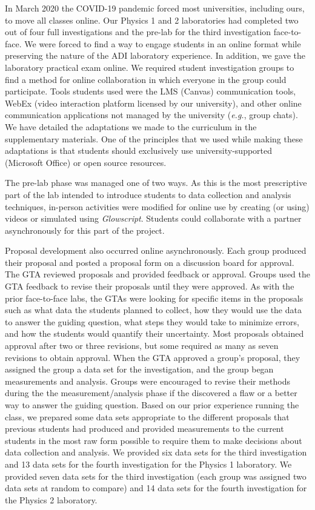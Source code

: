 \documentclass[aip, numerical, preprint]{revtex4-2}
\begin{document}
In March 2020 the COVID-19 pandemic forced most universities, including ours, to move all
classes online. Our Physics 1 and 2 laboratories had completed two out of
four full investigations and the pre-lab for the third investigation face-to-face. We were
forced to find a way to engage students in an online format while preserving the nature of the
ADI laboratory experience. In addition, we gave the laboratory practical exam online. We
required student investigation groups to find a method for online collaboration in which
everyone in the group could participate. Tools students used were the LMS (Canvas)
communication tools, WebEx (video interaction platform licensed by our university),
and other online communication applications not managed by the university (\emph{e.g.}, group
chats). We have detailed the adaptations we made to the curriculum in the supplementary
materials.  One of the principles that we used while making these adaptations is that students
should exclusively use university-supported (Microsoft Office) or open source resources.

The pre-lab phase was managed one of two ways.  As this is the most prescriptive part of the lab 
intended to introduce students to data collection and analysis techniques, in-person
activities were modified for online use by creating (or using) videos or simulated using
\emph{Glowscript}.\citep{glowscript} Students could collaborate with a partner asynchronously
for this part of the project.

Proposal development also occurred online asynchronously.  Each group produced their proposal
and posted a proposal form on a discussion board for approval. The GTA reviewed proposals and
provided feedback or approval. Groups used the GTA feedback to revise their proposals until
they were approved. As with the prior face-to-face labs, the GTAs were looking for specific items in 
the proposals such as what data the students planned to collect, how they would use the data to 
answer the guiding question, what steps they would take to minimize errors, and how the students 
would quantify their uncertainty. Most proposals obtained approval after two or three revisions, but 
some required as many as seven revisions to obtain approval. When the GTA approved a group's
proposal, they assigned the group a data set for the investigation, and the group began
measurements and analysis. Groups were encouraged to revise their methods during the the 
measurement/analysis phase if the discovered a flaw or a better way to answer the guiding question. 
Based on our prior experience running the class, we prepared some
data sets appropriate to the different proposals that previous students had produced and
provided measurements to the current students in the most raw form possible to require them to
make decisions about data collection and analysis. We provided six data sets for the third investigation 
and 13 data sets for the fourth investigation for the Physics 1 laboratory. We provided seven data sets 
for the third investigation (each group was assigned two data sets at random to compare) and 14 data 
sets for the fourth investigation for the Physics 2 laboratory.
\end{document}
